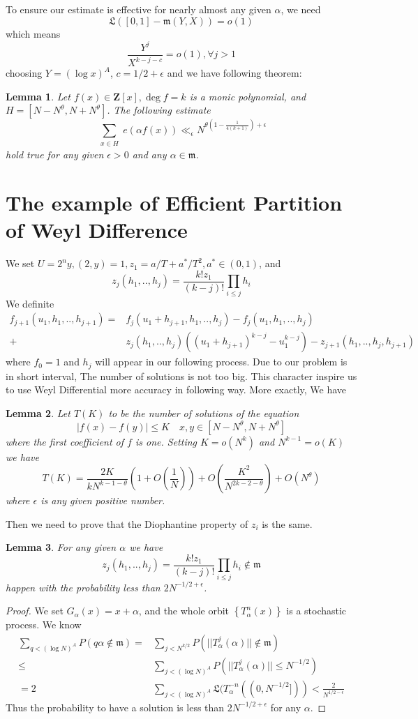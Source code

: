 \documentclass[10pt]{article}
\newtheorem{lemma}{Lemma}[section]
\begin{document}
To ensure our estimate is effective for nearly almost any given $\alpha$, we need
\[
\mathfrak{L}([0,1]-\mathfrak{m}(Y,X))=o(1)
\]
which means
\[
\frac{Y^j}{X^{k-j-c}}=o(1),\forall j>1
\]
choosing $Y=(\log x)^A$, $c=1/2+\epsilon$ and we have following theorem:
\begin{lemma}
Let $f(x)\in\textbf{Z}[x],\deg f=k$ is a monic polynomial, and $H=[N-N^\theta,N+N^\theta]$. The following estimate
\[
\sum\limits_{\substack{x\in H}}e(\alpha f(x))\ll_\epsilon N^{\theta(1-\frac{1}{4(k+1)})+\epsilon}
\]
hold true for any given $\epsilon>0$ and any $\alpha\in\mathfrak{m}$.
\end{lemma}
\section{The example of Efficient Partition of Weyl Difference}
We set $U=2^ny,(2,y)=1,z_1=a/T+a^*/T^2,a^*\in(0,1)$, and
\[
z_j(h_1,..,h_j)=\frac{k!z_1}{(k-j)!}\prod\limits_{i\leq j}h_i
\]
We definite
\begin{align*}
f_{j+1}(u_1,h_1,..,h_{j+1})=&f_{j}(u_1+h_{j+1},h_1,..,h_{j})-f_{j}(u_1,h_1,..,h_{j})\\+&z_j(h_1,..,h_j)((u_1+h_{j+1})^{k-j}-u_1^{k-j})-z_{j+1}(h_1,..,h_j,h_{j+1})
\end{align*}
where $f_0=1$ and $h_j$ will appear in our following process. Due to our problem is in short interval, The number of solutions is not too big. This character inspire us to use Weyl Differential more accuracy in following way. More exactly, We have
\begin{lemma}
Let $T(K)$ to be the number of solutions of the equation 
\[
|f(x)-f(y)|\leq K\quad x,y\in[N-N^\theta,N+N^\theta]
\]
where the first coefficient of $f$ is one. Setting $K=o(N^{k})$ and $N^{k-1}=o(K)$ we have
\[
T(K)=\frac{2K}{kN^{k-1-\theta}}(1+O(\frac{1}{N}))+O(\frac{K^{2}}{N^{2k-2-\theta}})+O(N^\theta)
\]
where $\epsilon$ is any given positive number.
\end{lemma}
Then we need to prove that the Diophantine property of $z_i$ is the same. 
\begin{lemma}
For any given $\alpha$ we have
\[
z_j(h_1,..,h_j)=\frac{k!z_1}{(k-j)!}\prod\limits_{i\leq j}h_i\notin\mathfrak{m}
\]
happen with the probability less than $2N^{-1/2+\epsilon}$.
\end{lemma}
\begin{proof}
We set $G_\alpha(x)=x+\alpha$, and the whole orbit $\left\{T^n_\alpha(x)\right\}$ is a stochastic process. We know
\begin{align*}
\sum\limits_{q<(\log N)^A}P(q\alpha\notin\mathfrak{m})
=&\sum\limits_{j<N^{k/2}}P(||T^j_\alpha(\alpha)||\notin\mathfrak{m})\\
\leq&\sum\limits_{j<(\log N)^A}P(||T^j_\alpha(\alpha)||\leq N^{-1/2})\\
=2&\sum\limits_{j<(\log N)^A}\mathfrak{L}(T^{-n}_\alpha((0,N^{-1/2}]))<\frac{2}{N^{1/2-\epsilon}}
\end{align*}
Thus the probability to have a solution is less than $2N^{-1/2+\epsilon}$ for any $\alpha$. 
\end{proof}
\end{document}
